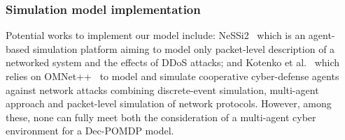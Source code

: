 \begin{enumerate}[label=\arabic*),itemjoin={;\quad}]

\end{enumerate}

\subsubsection{Simulation model implementation}

\noindent
Potential works to implement our model include: NeSSi2~\cite{DGrunewald2011} which is an agent-based simulation platform aiming to model only packet-level description of a networked system and the effects of DDoS attacks; and Kotenko et al.~\cite{IKotenko2007} which relies on OMNet++~\cite{Varga2010} to model and simulate cooperative cyber-defense agents against network attacks combining discrete-event simulation, multi-agent approach and packet-level simulation of network protocols.
However, among these, none can fully meet both the consideration of a multi-agent cyber environment for a Dec-POMDP model.

